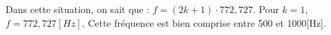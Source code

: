 %
%
    Dans cette situation, on sait que : \(f=(2k+1) \cdot 772,727\).
    Pour \(k=1\), \(f=772,727[Hz]\). Cette fréquence est bien comprise entre 500 et 1000[Hz].
